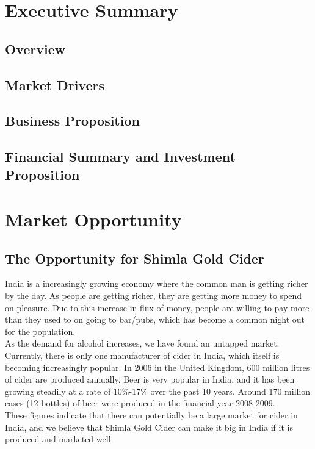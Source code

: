 \documentclass[11pt]{article}
\begin{document}
\newpage

\section{Executive Summary}
  \subsection{Overview}
  \subsection{Market Drivers}
  \subsection{Business Proposition}
  \subsection{Financial Summary and Investment Proposition}
\newpage
\section{Market Opportunity}
  \subsection{The Opportunity for Shimla Gold Cider}
		India is a increasingly growing economy where the common man is getting
		richer by the day. As people are getting richer, they are getting more
		money to spend on pleasure. Due to this increase in flux of money, people
		are willing to pay more than they used to on going to bar/pubs, which 
		has become a common night out for the population. \\
		As the demand for alcohol increases, we have found an untapped market.
		Currently, there is only one manufacturer of cider in India, which itself
		is becoming increasingly popular. In 2006 in the United Kingdom, 600 million 
		litres of cider are produced annually. Beer is very popular in India, and
		it has been growing steadily at a rate of 10\%-17\% over the past 10 years.
		Around 170 million cases (12 bottles) of beer were produced in the financial
		year 2008-2009. \\
		These figures indicate that there can potentially be a large market for
		cider in India, and we believe that Shimla Gold Cider can make it big in
		India if it is produced and marketed well.
\end{document}
